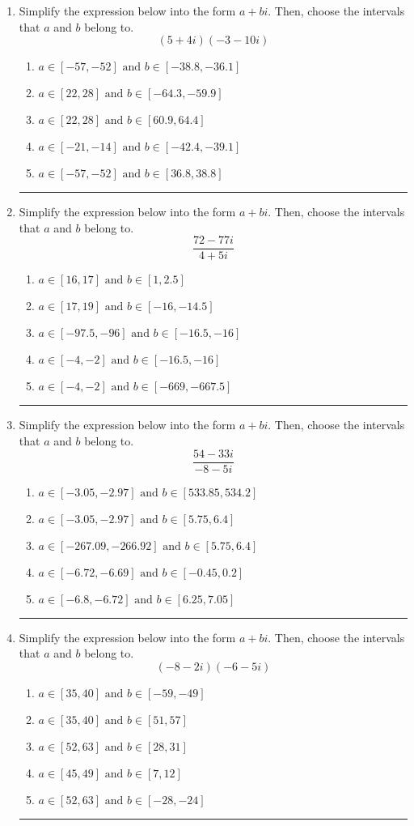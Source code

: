 \documentclass[14pt]{extbook}
\newcommand{\litem}[1]{\item#1\hspace*{-1cm}\rule{\textwidth}{0.4pt}}
\begin{document}
\begin{enumerate}
\litem{
Simplify the expression below into the form $a+bi$. Then, choose the intervals that $a$ and $b$ belong to.\[ (5 + 4 i)(-3 - 10 i) \]\begin{enumerate}[label=\Alph*.]
\item \( a \in [-57, -52] \text{ and } b \in [-38.8, -36.1] \)
\item \( a \in [22, 28] \text{ and } b \in [-64.3, -59.9] \)
\item \( a \in [22, 28] \text{ and } b \in [60.9, 64.4] \)
\item \( a \in [-21, -14] \text{ and } b \in [-42.4, -39.1] \)
\item \( a \in [-57, -52] \text{ and } b \in [36.8, 38.8] \)

\end{enumerate} }
\litem{
Simplify the expression below into the form $a+bi$. Then, choose the intervals that $a$ and $b$ belong to.\[ \frac{72 - 77 i}{4 + 5 i} \]\begin{enumerate}[label=\Alph*.]
\item \( a \in [16, 17] \text{ and } b \in [1, 2.5] \)
\item \( a \in [17, 19] \text{ and } b \in [-16, -14.5] \)
\item \( a \in [-97.5, -96] \text{ and } b \in [-16.5, -16] \)
\item \( a \in [-4, -2] \text{ and } b \in [-16.5, -16] \)
\item \( a \in [-4, -2] \text{ and } b \in [-669, -667.5] \)

\end{enumerate} }
\litem{
Simplify the expression below into the form $a+bi$. Then, choose the intervals that $a$ and $b$ belong to.\[ \frac{54 - 33 i}{-8 - 5 i} \]\begin{enumerate}[label=\Alph*.]
\item \( a \in [-3.05, -2.97] \text{ and } b \in [533.85, 534.2] \)
\item \( a \in [-3.05, -2.97] \text{ and } b \in [5.75, 6.4] \)
\item \( a \in [-267.09, -266.92] \text{ and } b \in [5.75, 6.4] \)
\item \( a \in [-6.72, -6.69] \text{ and } b \in [-0.45, 0.2] \)
\item \( a \in [-6.8, -6.72] \text{ and } b \in [6.25, 7.05] \)

\end{enumerate} }
\litem{
Simplify the expression below into the form $a+bi$. Then, choose the intervals that $a$ and $b$ belong to.\[ (-8 - 2 i)(-6 - 5 i) \]\begin{enumerate}[label=\Alph*.]
\item \( a \in [35, 40] \text{ and } b \in [-59, -49] \)
\item \( a \in [35, 40] \text{ and } b \in [51, 57] \)
\item \( a \in [52, 63] \text{ and } b \in [28, 31] \)
\item \( a \in [45, 49] \text{ and } b \in [7, 12] \)
\item \( a \in [52, 63] \text{ and } b \in [-28, -24] \)

\end{enumerate} }
\end{enumerate}
\end{document}
